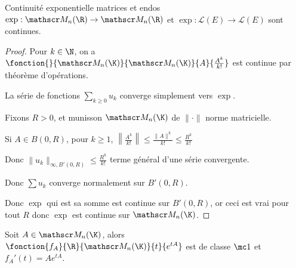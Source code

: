 \begin{proposition}{Continuité exponentielle matrices et endos}{}
    $\exp : \mathscr M_n(\R) \to \mathscr M_n(\R)$ et 
    $\exp : \mathscr L(E) \to \mathscr L(E)$ sont continues. 
\end{proposition}


\begin{proof}
    Pour $k \in \N$, on a 
    $\fonction{}{\mathscr M_n(\K)}{\mathscr M_n(\K)}{A}{\frac{A^k}{k!}}$ est continue par 
    théorème d'opérations. 

    La série de fonctions $\sum_{k \geqslant 0} u_k$ converge simplement 
    vers $\exp$. 

    Fixons $R > 0$, et munisson $\mathscr M_n(\K)$ de $\| \cdot \|$ norme matricielle. 

    Si $A \in B(0, R)$, pour $k \geqslant 1$, $\left\| \frac{A^k}{k!} \right\| \leqslant \frac{\|A\|^k}{k!} \leqslant \frac{R^k}{k!}$

    Donc $\|u_k\|_{\infty, B'(0, R)} \leqslant \frac{R^k}{k!}$ terme général d'une série convergente. 

    Donc $\sum u_k$ converge normalement sur $B'(0, R)$. 

    Donc $\exp$ qui est sa somme est continue sur $B'(0, R)$, or ceci est vrai pour tout $R$
    donc $\exp$ est continue sur $\mathscr M_n(\K)$.
\end{proof}


\begin{proposition}{}{}
    Soit $A \in \mathscr M_n(\K)$, alors $\fonction{f_A}{\R}{\mathscr M_n(\K)}{t}{e^{tA}}$ est de classe $\mc 1$ 
    et $f_A'(t) = A e^{tA}$.
\end{proposition}

